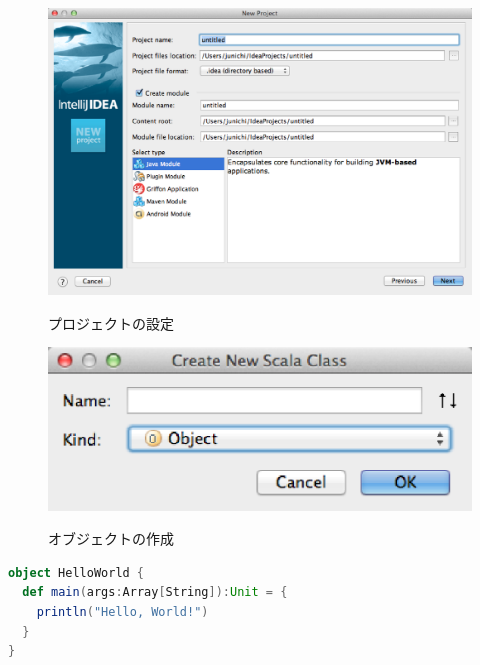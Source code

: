 \begin{figure}[h]
  \centering
  \caption{プロジェクトの設定}
  \includegraphics[scale=0.4]{img/new_project.eps}
  \label{fig:new_project}
\end{figure}

\begin{figure}[h]
  \centering
  \caption{オブジェクトの作成}
  \includegraphics[scale=0.4]{img/create_new_scala_class.eps}
  \label{fig:create_new_scala_class}
\end{figure}

\begin{lstlisting}[language=scala, label=src:helloworld, caption=HelloWorld.scala]
object HelloWorld {
  def main(args:Array[String]):Unit = {
    println("Hello, World!")
  }
}
\end{lstlisting}

